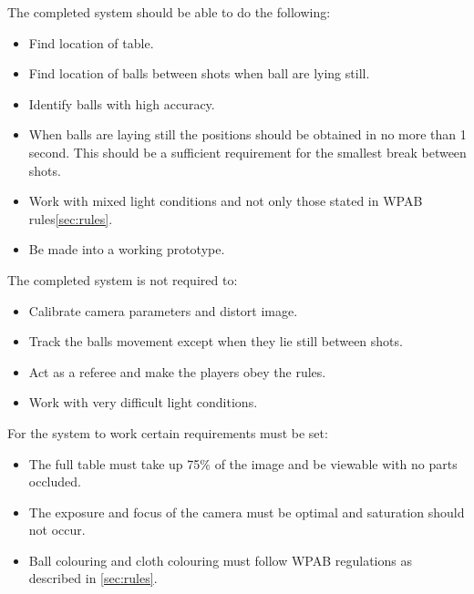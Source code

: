 The completed system should be able to do the following:

\begin{itemize}
\setlength{\itemsep}{0mm}
	\item Find location of table.
	\item Find location of balls between shots when ball are lying still.
	\item Identify balls with high accuracy.
	\item When balls are laying still the positions should be obtained in no more than 1 second. This should be a sufficient requirement for the smallest break between shots.
	\item Work with mixed light conditions and not only those stated in WPAB rules\ref{sec:rules}.
	\item Be made into a working prototype.
\end{itemize}

The completed system is not required to:

\begin{itemize}
\setlength{\itemsep}{0mm}
	\item Calibrate camera parameters and distort image.
	\item Track the balls movement except when they lie still between shots.
	\item Act as a referee and make the players obey the rules.
	\item Work with very difficult light conditions.
\end{itemize}
For the system to work certain requirements must be set:

\begin{itemize}
\setlength{\itemsep}{0mm}
	\item The full table must take up 75\% of the image and  be viewable with no parts occluded.
	\item The exposure and focus of the camera must be optimal and saturation should not occur.
	\item Ball colouring and cloth colouring must follow WPAB regulations as described in \ref{sec:rules}.
\end{itemize}